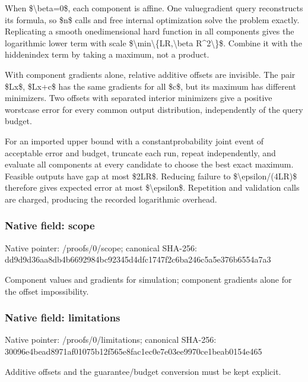\documentclass[10pt,a4paper]{article}
\begin{document}
When \$\textbackslash{}beta=0\$, each component is affine. One valuegradient query reconstructs its formula, so \$n\$ calls and free internal optimization solve the problem exactly. Replicating a smooth onedimensional hard function in all components gives the logarithmic lower term with scale \$\textbackslash{}min\textbackslash{}\{LR,\textbackslash{}beta R\textasciicircum{}2\textbackslash{}\}\$. Combine it with the hiddenindex term by taking a maximum, not a product.

With component gradients alone, relative additive offsets are invisible. The pair \$Lx\$, \$Lx+c\$ has the same gradients for all \$c\$, but its maximum has different minimizers. Two offsets with separated interior minimizers give a positive worstcase error for every common output distribution, independently of the query budget.

For an imported upper bound with a constantprobability joint event of acceptable error and budget, truncate each run, repeat independently, and evaluate all components at every candidate to choose the best exact maximum. Feasible outputs have gap at most \$2LR\$. Reducing failure to \$\textbackslash{}epsilon/(4LR)\$ therefore gives expected error at most \$\textbackslash{}epsilon\$. Repetition and validation calls are charged, producing the recorded logarithmic overhead.


\subsubsection{Native field: scope}


Native pointer: /proofs/0/scope; canonical SHA-256: dd9d9d36aa8db4b6692984bc\allowbreak{}92345d4dfc1747f2c6ba246c\allowbreak{}5a5e376b6554a7a3


Component values and gradients for simulation; component gradients alone for the offset impossibility.


\subsubsection{Native field: limitations}


Native pointer: /proofs/0/limitations; canonical SHA-256: 30096e4bead8971af01075b1\allowbreak{}2f565e8fac1ec0e7e03ee997\allowbreak{}0ce1beab0154e465


Additive offsets and the guarantee/budget conversion must be kept explicit.
\end{document}
